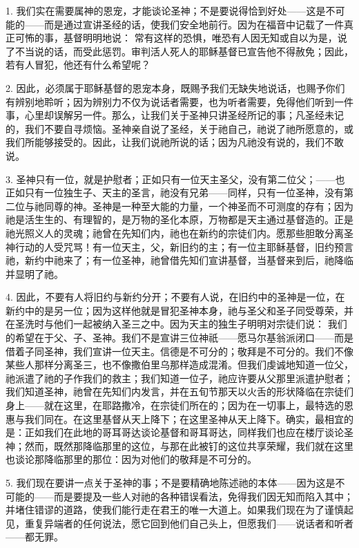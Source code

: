 1. 我们实在需要属神的恩宠，才能谈论圣神；不是要说得恰到好处——这是不可能的——而是通过宣讲圣经的话，使我们安全地前行。因为在福音中记载了一件真正可怖的事，基督明明地说：  常有这样的恐惧，唯恐有人因无知或自以为是，说了不当说的话，而受此惩罚。审判活人死人的耶稣基督已宣告他不得赦免；因此，若有人冒犯，他还有什么希望呢？\par

2. 因此，必须属于耶稣基督的恩宠本身，既赐予我们无缺失地说话，也赐予你们有辨别地聆听；因为辨别力不仅为说话者需要，也为听者需要，免得他们听到一件事，心里却误解另一件。那么，让我们关于圣神只讲圣经所记的事；凡圣经未记的，我们不要自寻烦恼。圣神亲自说了圣经，关于祂自己，祂说了祂所愿意的，或我们所能够接受的。因此，让我们说祂所说的话；因为凡祂没有说的，我们不敢说。\par

3. 圣神只有一位，就是护慰者；正如只有一位天主圣父，没有第二位父；——也正如只有一位独生子、天主的圣言，祂没有兄弟——同样，只有一位圣神，没有第二位与祂同尊的神。圣神是一种至大能的力量，一个神圣而不可测度的存有；因为祂是活生生的、有理智的，是万物的圣化本原，万物都是天主通过基督造的。正是祂光照义人的灵魂；祂曾在先知们内，祂也在新约的宗徒们内。愿那些胆敢分离圣神行动的人受咒骂！有一位天主，父，新旧约的主；有一位主耶稣基督，旧约预言祂，新约中祂来了；有一位圣神，祂曾借先知们宣讲基督，当基督来到后，祂降临并显明了祂。\par

4. 因此，不要有人将旧约与新约分开；不要有人说，在旧约中的圣神是一位，在新约中的是另一位；因为这样他就是冒犯圣神本身，祂与圣父和圣子同受尊荣，并在圣洗时与他们一起被纳入圣三之中。因为天主的独生子明明对宗徒们说： 我们的希望在于父、子、圣神。我们不是宣讲三位神祇——愿马尔基翁派闭口——而是借着子同圣神，我们宣讲一位天主。信德是不可分的；敬拜是不可分的。我们不像某些人那样分离圣三，也不像撒伯里乌那样造成混淆。但我们虔诚地知道一位父，祂派遣了祂的子作我们的救主；我们知道一位子，祂应许要从父那里派遣护慰者；我们知道圣神，祂曾在先知们内发言，并在五旬节那天以火舌的形状降临在宗徒们身上——就在这里，在耶路撒冷，在宗徒们所在的；因为在一切事上，最特选的恩惠与我们同在。在这里基督从天上降下；在这里圣神从天上降下。确实，最相宜的是：正如我们在此地的哥耳哥达谈论基督和哥耳哥达，同样我们也应在楼厅谈论圣神；然而，既然那降临那里的这位，与那在此被钉的这位共享荣耀，我们就在这里也谈论那降临那里的那位：因为对他们的敬拜是不可分的。\par

5. 我们现在要讲一点关于圣神的事；不是要精确地陈述祂的本体——因为这是不可能的——而是要提及一些人对祂的各种错误看法，免得我们因无知而陷入其中；并堵住错谬的道路，使我们能行走在君王的唯一大道上。如果我们现在为了谨慎起见，重复异端者的任何说法，愿它回到他们自己头上，但愿我们——说话者和听者——都无罪。\par

